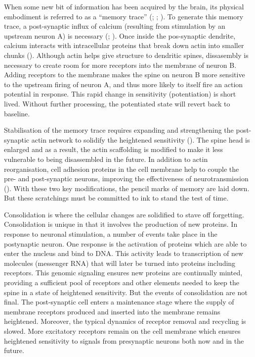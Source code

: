 \documentclass[
  jou,
  floatsintext,
  longtable,
  nolmodern,
  notxfonts,
  notimes,
  donotrepeattitle,
  colorlinks=true,linkcolor=blue,citecolor=blue,urlcolor=blue]{apa7}
\begin{document}
When some new bit of information has been acquired by the brain, its
physical embodiment is referred to as a ``memory trace''
(;
;
). To generate this memory
trace, a post-synaptic influx of calcium (resulting from stimulation by
an upstream neuron A) is necessary
(;
). Once
inside the pos-synaptic dendrite, calcium interacts with intracellular
proteins that break down actin into smaller chunks
(). Although actin
helps give structure to dendritic spines, dissasembly is necessary to
create room for more receptors into the membrane of neuron B. Adding
receptors to the membrane makes the spine on neuron B more sensitive to
the upstream firing of neuron A, and thus more likely to itself fire an
action potential in response. This rapid change in sensitivity
(potentiation) is short lived. Without further processing, the
potentiated state will revert back to baseline.

Stabilisation of the memory trace requires expanding and strengthening
the post-synaptic actin network to solidify the heightened sensitivity
(). The spine head is
enlarged and as a result, the actin scaffolding is modified to make it
less vulnerable to being disassembled in the future. In addition to
actin reorganisation, cell adhesion proteins in the cell membrane help
to couple the pre- and post-synaptic neurons, improving the
effectiveness of neurotransmission
(). With these
two key modifications, the pencil marks of memory are laid down. But
these scratchings must be committed to ink to stand the test of time.

Consolidation is where the cellular changes are solidified to stave off
forgetting. Consolidation is unique in that it involves the production
of new proteins. In response to neuronal stimulation, a number of events
take place in the postynaptic neuron. One response is the activation of
proteins which are able to enter the nucleus and bind to DNA. This
activity leads to transcription of new molecules (messenger RNA) that
will later be turned into proteins including receptors. This genomic
signaling ensures new proteins are continually minted, providing a
sufficient pool of receptors and other elements needed to keep the spine
in a state of heightened sensitivity. But the events of consolidation
are not final. The post-synaptic cell enters a maintenance stage where
the supply of membrane receptors produced and inserted into the membrane
remains heightened. Moreover, the typical dynamics of receptor removal
and recycling is slowed. More excitatory receptors remain on the cell
membrane which ensures heightened sensitivity to signals from
presynaptic neurons both now and in the future.
\end{document}
